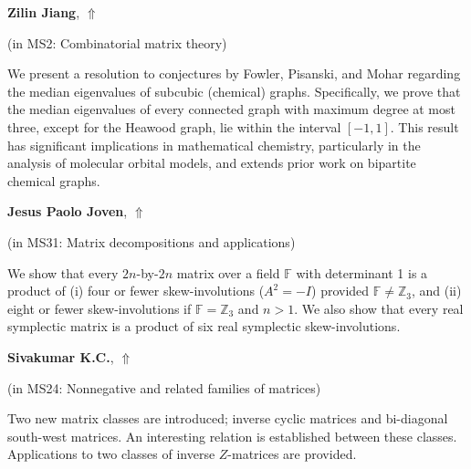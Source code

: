 \documentclass[ILAS2025-program.tex]{subfiles}
\begin{document}
\hypertarget{down0033}{}\begin{ilasabstract}
    
\textbf{Zilin Jiang},  \hfill \hyperlink{up0033}{$\Uparrow$}
    
    
(in {\color{mstitle}MS2: Combinatorial matrix theory})
        
\mtskip
    We present a resolution to conjectures by Fowler, Pisanski, and Mohar regarding the median eigenvalues of subcubic (chemical) graphs. Specifically, we prove that the median eigenvalues of every connected graph with maximum degree at most three, except for the Heawood graph, lie within the interval $[-1, 1]$. This result has significant implications in mathematical chemistry, particularly in the analysis of molecular orbital models, and extends prior work on bipartite chemical graphs.

\end{ilasabstract}
    

\hypertarget{down0308}{}\begin{ilasabstract}
    
\textbf{Jesus Paolo Joven},  \hfill \hyperlink{up0308}{$\Uparrow$}
    
    
(in {\color{mstitle}MS31: Matrix decompositions and applications})
        
\mtskip
    We show that every $2n$-by-$2n$ matrix over a field $\mathbb{F}$ with determinant 1 is a product of (i) four or fewer skew-involutions ($A^2 = -I$) provided $\mathbb{F} \neq \mathbb{Z}_3$, and (ii) eight or fewer skew-involutions if $\mathbb{F} = \mathbb{Z}_3$ and $n > 1$. We also show that every real symplectic matrix is a product of six real symplectic skew-involutions. 

\end{ilasabstract}
    

\hypertarget{down0353}{}\begin{ilasabstract}
    
\textbf{Sivakumar K.C.},  \hfill \hyperlink{up0353}{$\Uparrow$}
    
    
(in {\color{mstitle}MS24: Nonnegative and related families of matrices})
        
\mtskip
    Two new matrix classes are introduced; inverse cyclic matrices and bi-diagonal south-west matrices. An interesting relation is established between these classes. Applications to two classes of inverse $Z$-matrices are provided.

\end{ilasabstract}
    
\end{document}

